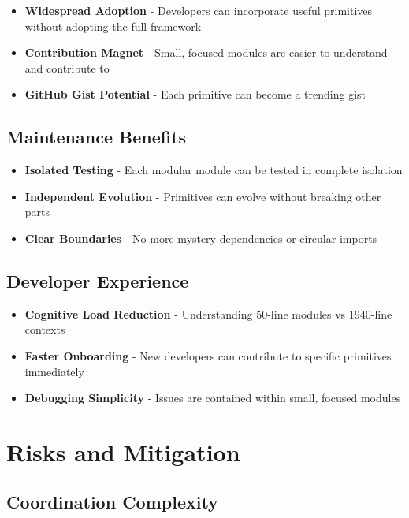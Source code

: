 \documentclass[11pt]{article}
\begin{document}
\begin{itemize}
\item \textbf{Widespread Adoption} - Developers can incorporate useful primitives without adopting the full framework
\item \textbf{Contribution Magnet} - Small, focused modules are easier to understand and contribute to
\item \textbf{GitHub Gist Potential} - Each primitive can become a trending gist
\end{itemize}

\subsection{Maintenance Benefits}

\begin{itemize}
\item \textbf{Isolated Testing} - Each modular module can be tested in complete isolation
\item \textbf{Independent Evolution} - Primitives can evolve without breaking other parts
\item \textbf{Clear Boundaries} - No more mystery dependencies or circular imports
\end{itemize}

\subsection{Developer Experience}

\begin{itemize}
\item \textbf{Cognitive Load Reduction} - Understanding 50-line modules vs 1940-line contexts
\item \textbf{Faster Onboarding} - New developers can contribute to specific primitives immediately
\item \textbf{Debugging Simplicity} - Issues are contained within small, focused modules
\end{itemize}

\section{Risks and Mitigation}

\subsection{Coordination Complexity}
\end{document}

